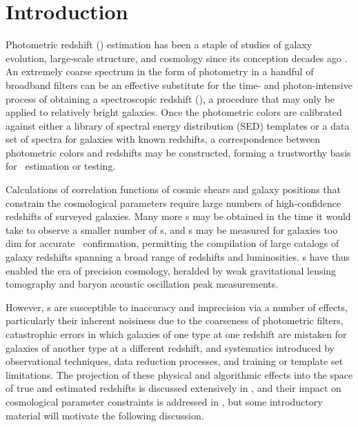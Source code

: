 \renewcommand{\chapid}{intro}

\chapter{ Introduction  }


Photometric redshift (\pz) estimation has been a staple of studies of galaxy evolution, large-scale structure, and cosmology since its conception decades ago \citep{Baum1962}.  
An extremely coarse spectrum in the form of photometry in a handful of broadband filters can be an effective substitute for the time- and photon-intensive process of obtaining a spectroscopic redshift (\sz), a procedure that may only be applied to relatively bright galaxies.  
Once the photometric colors are calibrated against either a library of spectral energy distribution (SED) templates or a data set of spectra for galaxies with known redshifts, a correspondence between photometric colors and redshifts may be constructed, forming a trustworthy basis for \pz\ estimation or testing.

Calculations of correlation functions of cosmic shears and galaxy positions that constrain the cosmological parameters require large numbers of high-confidence redshifts of surveyed galaxies.  
Many more \pz s may be obtained in the time it would take to observe a smaller number of \sz s, and \pz s may be measured for galaxies too dim for accurate \sz\ confirmation, permitting the compilation of large catalogs of galaxy redshifts spanning a broad range of redshifts and luminosities.  
\Pz s have thus enabled the era of precision cosmology, heralded by weak gravitational lensing tomography and baryon acoustic oscillation peak measurements.  

However, \pz s are susceptible to inaccuracy and imprecision via a number of effects, particularly their inherent noisiness due to the coarseness of photometric filters, catastrophic errors in which galaxies of one type at one redshift are mistaken for galaxies of another type at a different redshift, and systematics introduced by observational techniques, data reduction processes, and training or template set limitations.  
The projection of these physical and algorithmic effects into the space of true and estimated redshifts is discussed extensively in , and their impact on cosmological parameter constraints is addressed in , but some introductory material will motivate the following discussion.

